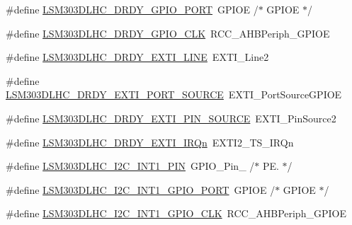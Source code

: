 \begin{DoxyCompactItemize}
\#define \hyperlink{group__STM32F3__DISCOVERY__LSM303DLHC__Exported__Constants_gac6bf7e154ee199a2c678d9573b258f86}{L\+S\+M303\+D\+L\+H\+C\+\_\+\+D\+R\+D\+Y\+\_\+\+G\+P\+I\+O\+\_\+\+P\+O\+R\+T}~G\+P\+I\+O\+E                       /$\ast$ G\+P\+I\+O\+E $\ast$/
\item 
\#define \hyperlink{group__STM32F3__DISCOVERY__LSM303DLHC__Exported__Constants_ga0b9c1eab693cb0ac9814d8735d4b2a56}{L\+S\+M303\+D\+L\+H\+C\+\_\+\+D\+R\+D\+Y\+\_\+\+G\+P\+I\+O\+\_\+\+C\+L\+K}~R\+C\+C\+\_\+\+A\+H\+B\+Periph\+\_\+\+G\+P\+I\+O\+E
\item 
\#define \hyperlink{group__STM32F3__DISCOVERY__LSM303DLHC__Exported__Constants_gaa471702c684bb462c1e7e263d2df1177}{L\+S\+M303\+D\+L\+H\+C\+\_\+\+D\+R\+D\+Y\+\_\+\+E\+X\+T\+I\+\_\+\+L\+I\+N\+E}~E\+X\+T\+I\+\_\+\+Line2
\item 
\#define \hyperlink{group__STM32F3__DISCOVERY__LSM303DLHC__Exported__Constants_ga370b02c17e91a55e7f09a01e13485a29}{L\+S\+M303\+D\+L\+H\+C\+\_\+\+D\+R\+D\+Y\+\_\+\+E\+X\+T\+I\+\_\+\+P\+O\+R\+T\+\_\+\+S\+O\+U\+R\+C\+E}~E\+X\+T\+I\+\_\+\+Port\+Source\+G\+P\+I\+O\+E
\item 
\#define \hyperlink{group__STM32F3__DISCOVERY__LSM303DLHC__Exported__Constants_ga2e8632fca772633654f480dd9240a940}{L\+S\+M303\+D\+L\+H\+C\+\_\+\+D\+R\+D\+Y\+\_\+\+E\+X\+T\+I\+\_\+\+P\+I\+N\+\_\+\+S\+O\+U\+R\+C\+E}~E\+X\+T\+I\+\_\+\+Pin\+Source2
\item 
\#define \hyperlink{group__STM32F3__DISCOVERY__LSM303DLHC__Exported__Constants_gaf69ff23ba05b985eca1cf9bca5f1d385}{L\+S\+M303\+D\+L\+H\+C\+\_\+\+D\+R\+D\+Y\+\_\+\+E\+X\+T\+I\+\_\+\+I\+R\+Qn}~E\+X\+T\+I2\+\_\+\+T\+S\+\_\+\+I\+R\+Qn
\item 
\#define \hyperlink{group__STM32F3__DISCOVERY__LSM303DLHC__Exported__Constants_ga06e952cdf79f493e91d8f3f9ceaba015}{L\+S\+M303\+D\+L\+H\+C\+\_\+\+I2\+C\+\_\+\+I\+N\+T1\+\_\+\+P\+I\+N}~G\+P\+I\+O\+\_\+\+Pin\+\_                  /$\ast$ P\+E. $\ast$/
\item 
\#define \hyperlink{group__STM32F3__DISCOVERY__LSM303DLHC__Exported__Constants_gae84c3a57c99ab75c9fe6649ac9e13e58}{L\+S\+M303\+D\+L\+H\+C\+\_\+\+I2\+C\+\_\+\+I\+N\+T1\+\_\+\+G\+P\+I\+O\+\_\+\+P\+O\+R\+T}~G\+P\+I\+O\+E                       /$\ast$ G\+P\+I\+O\+E $\ast$/
\item 
\#define \hyperlink{group__STM32F3__DISCOVERY__LSM303DLHC__Exported__Constants_gaec88b84ea9cd79cec7663ed4d02e074b}{L\+S\+M303\+D\+L\+H\+C\+\_\+\+I2\+C\+\_\+\+I\+N\+T1\+\_\+\+G\+P\+I\+O\+\_\+\+C\+L\+K}~R\+C\+C\+\_\+\+A\+H\+B\+Periph\+\_\+\+G\+P\+I\+O\+E

\end{DoxyCompactItemize}
